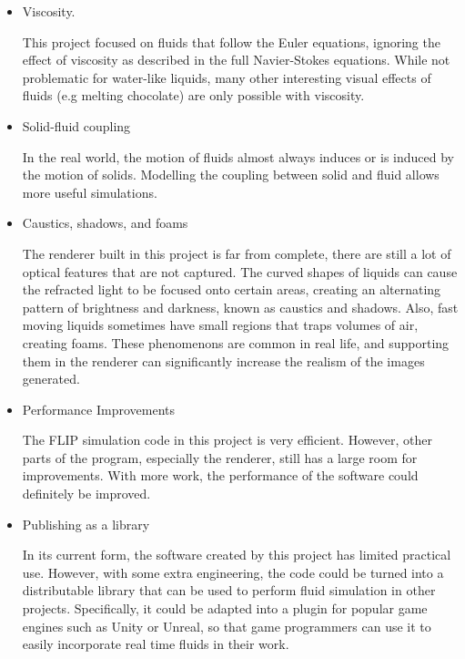 \begin{itemize}
    \item Viscosity.
    
    This project focused on fluids that follow the Euler equations, ignoring the effect of viscosity as described in the full Navier-Stokes equations. While not problematic for water-like liquids, many other interesting visual effects of fluids (e.g melting chocolate) are only possible with viscosity. 
    

    \item Solid-fluid coupling
    
    In the real world, the motion of fluids almost always induces or is induced by the motion of solids. Modelling the coupling between solid and fluid allows more useful simulations. 

    \item Caustics, shadows, and foams
    
    The renderer built in this project is far from complete, there are still a lot of optical features that are not captured. The curved shapes of liquids can cause the refracted light to be focused onto certain areas, creating an alternating pattern of brightness and darkness, known as caustics and shadows. Also, fast moving liquids sometimes have small regions that traps volumes of air, creating foams. These phenomenons are common in real life, and supporting them in the renderer can significantly increase the realism of the images generated.

    \item Performance Improvements
    
    The FLIP simulation code in this project is very efficient. However, other parts of the program, especially the renderer, still has a large room for improvements. With more work, the performance of the software could definitely be improved.


    \item Publishing as a library
    
    In its current form, the software created by this project has limited practical use. However, with some extra engineering, the code could be turned into a distributable library that can be used to perform fluid simulation in other projects. Specifically, it could be adapted into a plugin for popular game engines such as Unity or Unreal, so that game programmers can use it to easily incorporate real time fluids in their work. 
    
\end{itemize}

